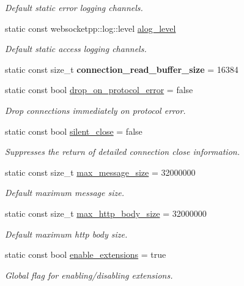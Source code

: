 \begin{DoxyCompactItemize}
\begin{DoxyCompactList}\small\item\em Default static error logging channels. \end{DoxyCompactList}\item 
static const websocketpp\+::log\+::level \mbox{\hyperlink{structwebsocketpp_1_1config_1_1debug__core_afed6fcfe2f8950b959713c7459e3645c}{alog\+\_\+level}}
\begin{DoxyCompactList}\small\item\em Default static access logging channels. \end{DoxyCompactList}\item 
\mbox{\label{structwebsocketpp_1_1config_1_1debug__core_a7980b627f735f03d4e48d39d949dcb0a}} 
static const size\+\_\+t {\bfseries connection\+\_\+read\+\_\+buffer\+\_\+size} = 16384
\item 
static const bool \mbox{\hyperlink{structwebsocketpp_1_1config_1_1debug__core_a0f046a730b161555c644dc40df9ea870}{drop\+\_\+on\+\_\+protocol\+\_\+error}} = false
\begin{DoxyCompactList}\small\item\em Drop connections immediately on protocol error. \end{DoxyCompactList}\item 
static const bool \mbox{\hyperlink{structwebsocketpp_1_1config_1_1debug__core_a961630bca024033059ef50863d1fc174}{silent\+\_\+close}} = false
\begin{DoxyCompactList}\small\item\em Suppresses the return of detailed connection close information. \end{DoxyCompactList}\item 
static const size\+\_\+t \mbox{\hyperlink{structwebsocketpp_1_1config_1_1debug__core_a2c46fa8d65f3a6a69ccec42bd0e91e20}{max\+\_\+message\+\_\+size}} = 32000000
\begin{DoxyCompactList}\small\item\em Default maximum message size. \end{DoxyCompactList}\item 
static const size\+\_\+t \mbox{\hyperlink{structwebsocketpp_1_1config_1_1debug__core_a95ea7d50bc0617bc447d98dca1ea7e0d}{max\+\_\+http\+\_\+body\+\_\+size}} = 32000000
\begin{DoxyCompactList}\small\item\em Default maximum http body size. \end{DoxyCompactList}\item 
\mbox{\label{structwebsocketpp_1_1config_1_1debug__core_a483b9b5f8929dddf7389f6a751400406}} 
static const bool \mbox{\hyperlink{structwebsocketpp_1_1config_1_1debug__core_a483b9b5f8929dddf7389f6a751400406}{enable\+\_\+extensions}} = true
\begin{DoxyCompactList}\small\item\em Global flag for enabling/disabling extensions. \end{DoxyCompactList}\end{DoxyCompactItemize}


